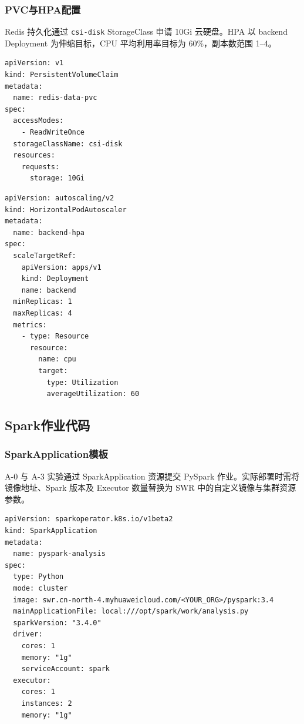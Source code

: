 \subsubsection{PVC与HPA配置}

Redis 持久化通过 \verb|csi-disk| StorageClass 申请 10Gi 云硬盘。HPA 以 backend Deployment 为伸缩目标，CPU 平均利用率目标为 60\%，副本数范围 1--4。

\begin{lstlisting}[caption={k8s/redis-pvc.yaml}, label=lst:redis-pvc]
apiVersion: v1
kind: PersistentVolumeClaim
metadata:
  name: redis-data-pvc
spec:
  accessModes:
    - ReadWriteOnce
  storageClassName: csi-disk
  resources:
    requests:
      storage: 10Gi
\end{lstlisting}

\begin{lstlisting}[caption={k8s/backend-hpa.yaml}, label=lst:backend-hpa]
apiVersion: autoscaling/v2
kind: HorizontalPodAutoscaler
metadata:
  name: backend-hpa
spec:
  scaleTargetRef:
    apiVersion: apps/v1
    kind: Deployment
    name: backend
  minReplicas: 1
  maxReplicas: 4
  metrics:
    - type: Resource
      resource:
        name: cpu
        target:
          type: Utilization
          averageUtilization: 60
\end{lstlisting}

\subsection{Spark作业代码}

\subsubsection{SparkApplication模板}

A-0 与 A-3 实验通过 SparkApplication 资源提交 PySpark 作业。实际部署时需将镜像地址、Spark 版本及 Executor 数量替换为 SWR 中的自定义镜像与集群资源参数。

\begin{lstlisting}[caption={spark/sparkapplication.yaml（模板）}, label=lst:sparkapplication]
apiVersion: sparkoperator.k8s.io/v1beta2
kind: SparkApplication
metadata:
  name: pyspark-analysis
spec:
  type: Python
  mode: cluster
  image: swr.cn-north-4.myhuaweicloud.com/<YOUR_ORG>/pyspark:3.4
  mainApplicationFile: local:///opt/spark/work/analysis.py
  sparkVersion: "3.4.0"
  driver:
    cores: 1
    memory: "1g"
    serviceAccount: spark
  executor:
    cores: 1
    instances: 2
    memory: "1g"
\end{lstlisting}

